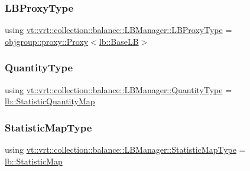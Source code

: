 \subsubsection{\texorpdfstring{L\+B\+Proxy\+Type}{LBProxyType}}
{\footnotesize\ttfamily using \hyperlink{structvt_1_1vrt_1_1collection_1_1balance_1_1_l_b_manager_a8b1a7735366beb85c2c2ccc3912cdd80}{vt\+::vrt\+::collection\+::balance\+::\+L\+B\+Manager\+::\+L\+B\+Proxy\+Type} =  \hyperlink{structvt_1_1objgroup_1_1proxy_1_1_proxy}{objgroup\+::proxy\+::\+Proxy}$<$\hyperlink{structvt_1_1vrt_1_1collection_1_1lb_1_1_base_l_b}{lb\+::\+Base\+LB}$>$}

\mbox{\label{structvt_1_1vrt_1_1collection_1_1balance_1_1_l_b_manager_ab76adf3f0da19ba30d9f95bb882bda65}} 
\subsubsection{\texorpdfstring{Quantity\+Type}{QuantityType}}
{\footnotesize\ttfamily using \hyperlink{structvt_1_1vrt_1_1collection_1_1balance_1_1_l_b_manager_ab76adf3f0da19ba30d9f95bb882bda65}{vt\+::vrt\+::collection\+::balance\+::\+L\+B\+Manager\+::\+Quantity\+Type} =  \hyperlink{namespacevt_1_1vrt_1_1collection_1_1lb_aa3a389ff9262dd6be27791dcf037ef38}{lb\+::\+Statistic\+Quantity\+Map}}

\mbox{\label{structvt_1_1vrt_1_1collection_1_1balance_1_1_l_b_manager_a3c6941b9c14a77e015047c659b817a85}} 
\subsubsection{\texorpdfstring{Statistic\+Map\+Type}{StatisticMapType}}
{\footnotesize\ttfamily using \hyperlink{structvt_1_1vrt_1_1collection_1_1balance_1_1_l_b_manager_a3c6941b9c14a77e015047c659b817a85}{vt\+::vrt\+::collection\+::balance\+::\+L\+B\+Manager\+::\+Statistic\+Map\+Type} =  \hyperlink{namespacevt_1_1vrt_1_1collection_1_1lb_a497ad83ef5825f2ea18ed20a228870d3}{lb\+::\+Statistic\+Map}}

